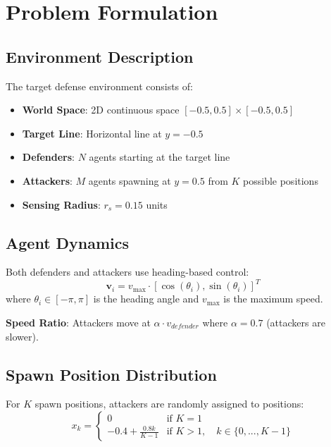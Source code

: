 \documentclass[11pt,a4paper]{article}
\begin{document}
\section{Problem Formulation}

\subsection{Environment Description}

The target defense environment consists of:
\begin{itemize}
    \item \textbf{World Space}: 2D continuous space $[-0.5, 0.5] \times [-0.5, 0.5]$
    \item \textbf{Target Line}: Horizontal line at $y = -0.5$
    \item \textbf{Defenders}: $N$ agents starting at the target line
    \item \textbf{Attackers}: $M$ agents spawning at $y = 0.5$ from $K$ possible positions
    \item \textbf{Sensing Radius}: $r_s = 0.15$ units
\end{itemize}

\subsection{Agent Dynamics}

Both defenders and attackers use heading-based control:
\begin{equation}
    \mathbf{v}_i = v_{\max} \cdot [\cos(\theta_i), \sin(\theta_i)]^T
\end{equation}
where $\theta_i \in [-\pi, \pi]$ is the heading angle and $v_{\max}$ is the maximum speed.

\textbf{Speed Ratio}: Attackers move at $\alpha \cdot v_{defender}$ where $\alpha = 0.7$ (attackers are slower).

\subsection{Spawn Position Distribution}

For $K$ spawn positions, attackers are randomly assigned to positions:
\begin{equation}
    x_k = \begin{cases}
        0 & \text{if } K = 1 \\
        -0.4 + \frac{0.8k}{K-1} & \text{if } K > 1, \quad k \in \{0, ..., K-1\}
    \end{cases}
\end{equation}
\end{document}
